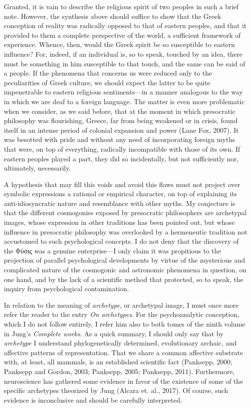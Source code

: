 \documentclass[a4paper]{article}
\begin{document}
Granted, it is vain to describe the religious spirit of two peoples in such a
brief note. However, the synthesis above should suffice to show that the Greek
conception of reality was radically opposed to that of eastern peoples, and that
it provided to them a complete perspective of the world, a sufficient framework
of experience. Whence, then, would the Greek spirit be so susceptible to eastern
influence? For, indeed, if an individual is, so to speak, touched by an idea,
there must be something in him susceptible to that touch, and the same can be
said of a people. If the phenomena that concerns us were reduced only to the
peculiarities of Greek culture, we should expect the latter to be quite
impenetrable to eastern religious sentiments---in a manner analogous to the way
in which we are deaf to a foreign language. The matter is even more problematic
when we consider, as we said before, that at the moment in which presocratic
philosophy was flourishing, Greece, far from being weakened or in crisis, found
itself in an intense period of colonial expansion and power (Lane Fox, 2007). It
was besotted with pride and without any need of incorporating foreign myths that
were, on top of everything, radically incompatible with those of its own. If
eastern peoples played a part, they did so incidentally, but not sufficiently
nor, ultimately, necessarily.

A hypothesis that may fill this voids and avoid this flaws must not project over
symbolic expressions a rational or empirical character, on top of explaining its
anti-idiosyncratic nature and resemblance with other myths. My conjecture is
that the different cosmogonies exposed by presocratic philosophers are
archetypal images, whose expression in other traditions has been pointed out,
but whose influence in presocratic philosophy was overlooked by a hermeneutic
tradition not accustomed to such psychological concepts. I do not deny that the
discovery of the Φύσις was a genuine enterprise---I only claim it was propitious
to the projection of parallel psychological developments by virtue of the
mysterious and complicated nature of the cosmogonic and astronomic phenomena in
question, on one hand, and by the lack of a scientific method that protected, so
to speak, the inquiry from psychological contamination.

In relation to the meaning of \textit{archetype}, or archetypal image, I must
once more refer the reader to the entry \textit{On archetypes}. For the
psychoanalytic conception, which I do not follow entirely, I refer him also to
both tomes of the ninth volume in Jung's \textit{Complete works}. As a quick
summary, I should only say that by \textit{archetype} I understand
phylogenetically determined, evolutionary archaic, and affective patterns of
representation. That we share a common affective substrate with, at least, all
mammals, is an established scientific fact (Panksepp, 2000; Panksepp and Gordon,
2003; Panksepp, 2005; Panksepp, 2011). Furthermore, neuroscience has gathered
some evidence in favor of the existence of some of the specific archetypes
theorized by Jung (Alcara et. al., 2017). Of course, such evidence is
inconclusive and should be carefully interpreted. 
\end{document}
